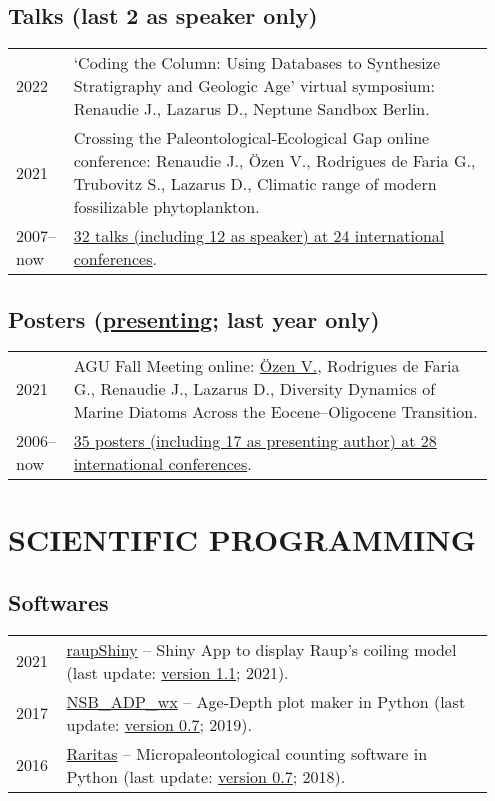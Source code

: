 \documentclass[11pt, a4paper]{article}
\begin{document}
\subsection[Talks]{Talks \textnormal{\footnotesize{(last 2 as speaker only)}}}
\begin{longtable}{@{}p{0.1\linewidth} P{0.85\linewidth}@{}}
2022 & `Coding the Column: Using Databases to Synthesize Stratigraphy and Geologic Age' virtual symposium: Renaudie J., Lazarus D., Neptune Sandbox Berlin.\\
2021 & Crossing the Paleontological-Ecological Gap online conference: Renaudie J., Özen V., Rodrigues de Faria G., Trubovitz S., Lazarus D., Climatic range of modern fossilizable phytoplankton.\\
2007--now  & \href{http://plannapus.github.io/static/conffull.pdf}{32 talks (including 12 as speaker) at 24 international conferences}.
\end{longtable}
\subsection[Posters]{Posters \textnormal{\footnotesize{(\underline{presenting}; last year only)}}}
\begin{longtable}{@{}p{0.1\linewidth} P{0.85\linewidth}@{}}
2021 & AGU Fall Meeting online: \underline{Özen V.}, Rodrigues de Faria G., Renaudie J., Lazarus D., Diversity Dynamics of Marine Diatoms Across the Eocene--Oligocene Transition.\\
2006--now  & \href{http://plannapus.github.io/static/conffull.pdf}{35 posters (including 17 as presenting author) at 28 international conferences}.
\end{longtable}

\section{SCIENTIFIC PROGRAMMING}
\subsection{Softwares}
\begin{longtable}{@{}p{0.1\linewidth} P{0.85\linewidth}@{}}
2021 & \href{http://github.com/plannapus/raupShiny/releases}{raupShiny} -- Shiny App to display Raup's coiling model (last update: \href{https://doi.org/10.5281/zenodo.5171827}{version 1.1}; 2021).\\
2017 & \href{http://github.com/plannapus/NSB_ADP_wx/releases}{NSB\_ADP\_wx} -- Age-Depth plot maker in Python (last update: \href{http://doi.org/10.5281/zenodo.3408657}{version 0.7}; 2019).\\
2016 & \href{http://github.com/plannapus/Raritas/releases}{Raritas} -- Micropaleontological counting software in Python (last update: \href{https://github.com/plannapus/Raritas/releases/tag/v0.7}{version 0.7}; 2018).\\
\end{longtable}
\end{document}
